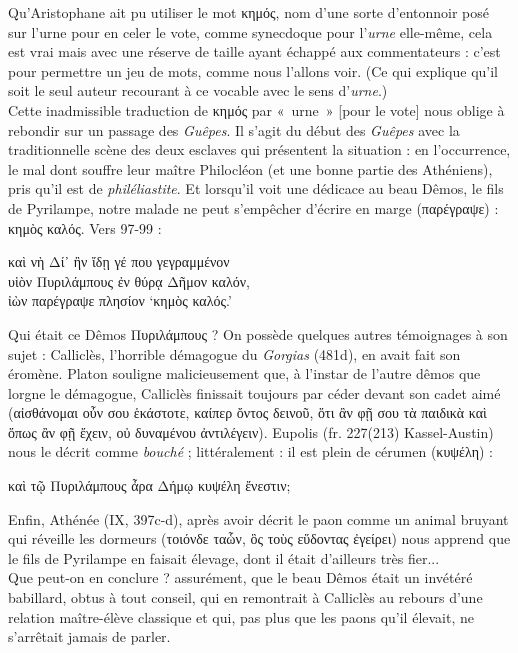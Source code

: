 \documentclass[12pt]{book}%
\newcommand{\italique}[1]{\textit{#1}}%
\newcommand{\citComm}[1]{\begin{quoting}[vskip=0pt] #1 \end{quoting}}%
\newenvironment{groupe}{%
\pstart%
\ledgroup%
}{%
\pend %
}%
\begin{document}
\begin{pages}
\begin{Leftside}
\begin{groupe}
{{Qu'Aristophane ait pu utiliser le mot κημός, nom d'une sorte d'entonnoir posé sur l'urne pour en celer le vote, comme synecdoque pour l'\italique{urne} elle-même, cela est vrai mais avec une réserve de taille ayant échappé aux commentateurs : c'est pour permettre un jeu de mots, comme nous l'allons voir. (Ce qui explique qu'il soit le seul auteur recourant à ce vocable avec le sens d'\italique{urne}.)\\
Cette inadmissible traduction de κημός par «~urne~» [pour le vote] nous oblige à rebondir sur un passage des \italique{Guêpes}. %
Il s'agit du début des \italique{Guêpes} avec la traditionnelle scène des deux esclaves qui présentent la situation : en l'occurrence, le mal dont souffre leur maître Philocléon (et une bonne partie des Athéniens), pris qu'il est de \italique{philéliastite}. Et lorsqu'il voit une dédicace au beau Dêmos, le fils de Pyrilampe, notre malade ne peut s'empêcher d'écrire en marge (παρέγραψε) : κημὸς καλός. Vers 97-99 :
\citComm{καὶ νὴ Δί᾽ ἢν ἴδῃ γέ που γεγραμμένον\\
υἱὸν Πυριλάμπους ἐν θύρᾳ Δῆμον καλόν,\\
ἰὼν παρέγραψε πλησίον `κημὸς καλός.'}%
Qui était ce Dêmos Πυριλάμπους ? On possède quelques autres témoignages à son sujet : Calliclès, l'horrible démagogue du \italique{Gorgias} (481d), en avait fait son éromène. 
Platon souligne malicieusement que, à l'instar de l'autre dêmos que lorgne le démagogue, Calliclès finissait toujours par céder devant son cadet aimé (αἰσθάνομαι οὖν σου ἑκάστοτε, καίπερ ὄντος δεινοῦ, ὅτι ἂν φῇ σου τὰ παιδικὰ καὶ ὅπως ἂν φῇ ἔχειν, οὐ δυναμένου ἀντιλέγειν). 
Eupolis (fr. 227(213) Kassel-Austin) nous le décrit comme \italique{bouché} ; littéralement : il est plein de cérumen (κυψέλη) : 
\citComm{καὶ τῷ Πυριλάμπους ἆρα Δήμῳ κυψέλη ἔνεστιν; }%
Enfin, Athénée (IX, 397c-d), après avoir décrit le paon comme un animal bruyant qui réveille les dormeurs (τοιόνδε ταὧν, ὃς τοὺς εὕδοντας ἐγείρει) nous apprend que le fils de Pyrilampe en faisait élevage, dont il était d'ailleurs très fier...\\
Que peut-on en conclure ? assurément, que le beau Dêmos était un invétéré babillard, obtus à tout conseil, qui en remontrait à Calliclès au rebours d'une relation maître-élève classique et qui, pas plus que les paons qu'il élevait, ne s'arrêtait jamais de parler.
}}
\end{groupe}
\end{Leftside}
\end{pages}
\end{document}
